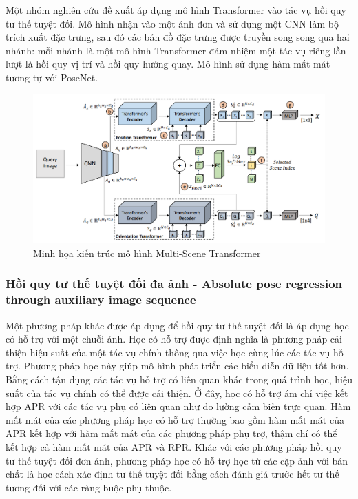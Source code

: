 Một nhóm nghiên cứu \cite{shavit2021learning, shavit2023coarse} đề xuất áp dụng mô hình Transformer vào tác vụ hồi quy tư thế tuyệt đối. Mô hình nhận vào một ảnh đơn và sử dụng một CNN làm bộ trích xuất đặc trưng, sau đó các bản đồ đặc trưng được truyền song song qua hai nhánh: mỗi nhánh là một mô hình Transformer đảm nhiệm một tác vụ riêng lần lượt là hồi quy vị trí và hồi quy hướng quay. Mô hình sử dụng hàm mất mát tương tự với PoseNet.
\begin{figure}[H]
    \centering
    \includegraphics[width=\textwidth]{pics/Chapter2/trans.png}
    \caption{Minh họa kiến trúc mô hình Multi-Scene Transformer \cite{shavit2021learning, shavit2023coarse}}
\end{figure}

\subsubsection*{Hồi quy tư thế tuyệt đối đa ảnh - Absolute pose regression through auxiliary image sequence}
Một phương pháp khác được áp dụng để hồi quy tư thế tuyệt đối là áp dụng học có hỗ trợ với một chuỗi ảnh. Học có hỗ trợ được định nghĩa là phương pháp cải thiện hiệu suất của một tác vụ chính thông qua việc học cùng lúc các tác vụ hỗ trợ. Phương pháp học này giúp mô hình phát triển các biểu diễn dữ liệu tốt hơn. Bằng cách tận dụng các tác vụ hỗ trợ có liên quan khác trong quá trình học, hiệu suất của tác vụ chính có thể được cải thiện. Ở đây, học có hỗ trợ ám chỉ việc kết hợp APR với các tác vụ phụ có liên quan như đo lường cảm biến trực quan. Hàm mất mát của các phương pháp học có hỗ trợ thường bao gồm hàm mất mát của APR kết hợp với hàm mất mát của các phương pháp phụ trợ, thậm chí có thể kết hợp cả hàm mất mát của APR và RPR. Khác với các phương pháp hồi quy tư thế tuyệt đối đơn ảnh, phương pháp học có hỗ trợ học từ các cặp ảnh với bản chất là học cách xác định tư thế tuyệt đối bằng cách đánh giá trước hết tư thế tương đối với các ràng buộc phụ thuộc.

